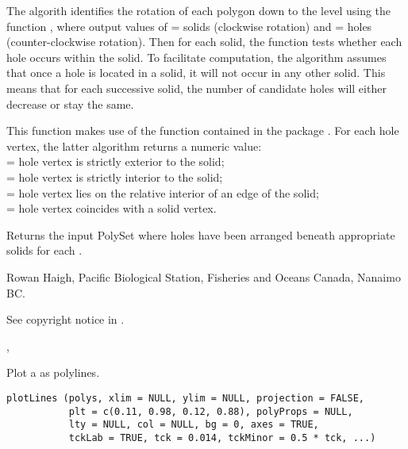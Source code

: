 \documentclass[letterpaper]{book}
\begin{document}
\begin{Details}\relax
The algorith identifies the rotation of each polygon down to the 
 level using the  function ,
where output values of  = solids (clockwise rotation) and 
 = holes (counter-clockwise rotation).
Then for each solid, the function tests whether each hole 
occurs within the solid. 
To facilitate computation, the algorithm assumes that once a 
hole is located in a solid, it will not occur in any other solid.
This means that for each successive solid, the number of 
candidate holes will either decrease or stay the same.

This function makes use of the  function 
contained in the package . For each hole vertex, the latter
algorithm returns a numeric value: \\{}
 = hole vertex is strictly exterior to the solid; \\{}
 = hole vertex is strictly interior to the solid; \\{}
 = hole vertex lies on the relative interior of an edge of the solid; \\{}
 = hole vertex coincides with a solid vertex.
\end{Details}
%
\begin{Value}
Returns the input PolySet where  holes have been arranged 
beneath appropriate  solids for each .
\end{Value}
%
\begin{Author}\relax
Rowan Haigh, Pacific Biological Station, Fisheries and Oceans Canada, Nanaimo BC.
\end{Author}
%
\begin{References}\relax
See copyright notice in .
\end{References}
%
\begin{SeeAlso}\relax
{}, 
\end{SeeAlso}
%
\begin{Description}\relax
Plot a  as polylines.
\end{Description}
%
\begin{Usage}
\begin{verbatim}
plotLines (polys, xlim = NULL, ylim = NULL, projection = FALSE,
           plt = c(0.11, 0.98, 0.12, 0.88), polyProps = NULL,
           lty = NULL, col = NULL, bg = 0, axes = TRUE,
           tckLab = TRUE, tck = 0.014, tckMinor = 0.5 * tck, ...)
\end{verbatim}
\end{Usage}
\end{document}
